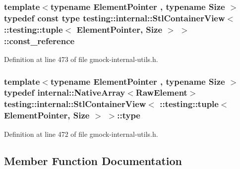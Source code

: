 \subsubsection[{\texorpdfstring{const\+\_\+reference}{const_reference}}]{\setlength{\rightskip}{0pt plus 5cm}template$<$typename Element\+Pointer , typename Size $>$ typedef const {\bf type} {\bf testing\+::internal\+::\+Stl\+Container\+View}$<$ \+::testing\+::tuple$<$ Element\+Pointer, Size $>$ $>$\+::{\bf const\+\_\+reference}}\hypertarget{classtesting_1_1internal_1_1_stl_container_view_3_01_1_1testing_1_1tuple_3_01_element_pointer_00_01_size_01_4_01_4_a4c69a4e22173b0e6f3eb55636d6a38f1}{}\label{classtesting_1_1internal_1_1_stl_container_view_3_01_1_1testing_1_1tuple_3_01_element_pointer_00_01_size_01_4_01_4_a4c69a4e22173b0e6f3eb55636d6a38f1}


Definition at line 473 of file gmock-\/internal-\/utils.\+h.

\subsubsection[{\texorpdfstring{type}{type}}]{\setlength{\rightskip}{0pt plus 5cm}template$<$typename Element\+Pointer , typename Size $>$ typedef {\bf internal\+::\+Native\+Array}$<$Raw\+Element$>$ {\bf testing\+::internal\+::\+Stl\+Container\+View}$<$ \+::testing\+::tuple$<$ Element\+Pointer, Size $>$ $>$\+::{\bf type}}\hypertarget{classtesting_1_1internal_1_1_stl_container_view_3_01_1_1testing_1_1tuple_3_01_element_pointer_00_01_size_01_4_01_4_aedefb897170f76518afbca6f87b5467c}{}\label{classtesting_1_1internal_1_1_stl_container_view_3_01_1_1testing_1_1tuple_3_01_element_pointer_00_01_size_01_4_01_4_aedefb897170f76518afbca6f87b5467c}


Definition at line 472 of file gmock-\/internal-\/utils.\+h.



\subsection{Member Function Documentation}
